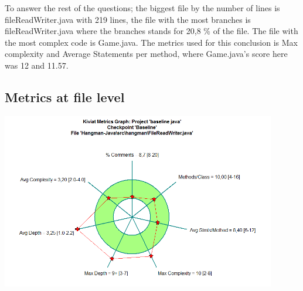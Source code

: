 \documentclass{article}
\begin{document}
To answer the rest of the questions; the biggest file by the number of lines is
 fileReadWriter.java with 219 lines, the file with the most branches is fileReadWriter.java
  where the branches stands for 20,8 \% of the file. The file with the most complex code is
   Game.java. The metrics used for this conclusion is Max complexity and Average Statements
   per method, where Game.java's score here was 12 and 11.57. 

\subsection{Metrics at file level}
\vspace {0.10 cm}
\begin{center}
\includegraphics[width=0.9\textwidth]{FileReadWriter-kiviat-before.png}
\end{center}
\end{document}
